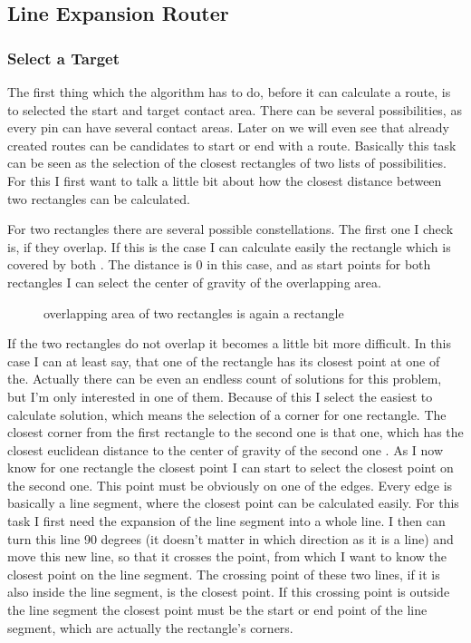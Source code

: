 \subsection{Line Expansion Router}

\subsubsection{Select a Target}
The first thing which the algorithm has to do, before it can calculate a route, is to selected the start and target contact area. There can be several possibilities, as every pin can have several contact areas. Later on we will even see that already created routes can be candidates to start or end with a route. Basically this task can be seen as the selection of the closest rectangles of two lists of possibilities. For this I first want to talk a little bit about how the closest distance between two rectangles can be calculated.

For two rectangles there are several possible constellations. The first one I check is, if they overlap. If this is the case I can calculate easily the rectangle which is covered by both . The distance is 0 in this case, and as start points for both rectangles I can select the center of gravity of the overlapping area.

\begin{figure}
	\centering
	
  	\caption{overlapping area of two rectangles is again a rectangle}
	\label{fig:rectangles_overlapping}
\end{figure}

If the two rectangles do not overlap it becomes a little bit more difficult. In this case I can at least say, that one of the rectangle has its closest point at one of the. Actually there can be even an endless count of solutions for this problem, but I'm only interested in one of them. Because of this I select the easiest to calculate solution, which means the selection of a corner for one rectangle. The closest corner from the first rectangle to the second one is that one, which has the closest euclidean distance to the center of gravity of the second one . As I now know for one rectangle the closest point I can start to select the closest point on the second one. This point must be obviously on one of the edges. Every edge is basically a line segment, where the closest point can be calculated easily. For this task I first need the expansion of the line segment into a whole line. I then can turn this line 90 degrees (it doesn't matter in which direction as it is a line) and move this new line, so that it crosses the point, from which I want to know the closest point on the line segment. The crossing point of these two lines, if it is also inside the line segment, is the closest point. If this crossing point is outside the line segment the closest point must be the start or end point of the line segment, which are actually the rectangle's corners.

